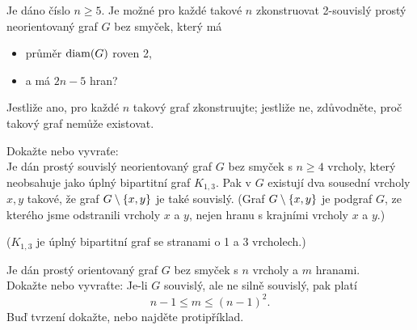\documentclass[11pt,a4paper]{article}
\begin{document}
\title{}
\author{Jakub Adamec\\XP01TGR}

\maketitle

\begin{exercise}
    Je dáno číslo $n \geq 5$. Je možné pro každé takové $n$ zkonstruovat 2-souvislý prostý neorientovaný graf $G$ bez 
    smyček, který má
    \vspace{-1em}
    \begin{itemize}[noitemsep]
        \item průměr $\operatorname*{diam}(G)$ roven 2,
        \item a má $2n-5$ hran?
    \end{itemize}
    \vspace{-1em}
    Jestliže ano, pro každé $n$ takový graf zkonstruujte; jestliže ne, zdůvodněte, proč takový graf nemůže existovat.
\end{exercise}
\begin{solution}

\end{solution}

\begin{exercise}
    Dokažte nebo vyvraťe:\\
    Je dán prostý souvislý neorientovaný graf $G$ bez smyček s $n \geq 4$ vrcholy, který neobsahuje jako  úplný bipartitní graf $K_{1,3}$. Pak v $G$ existují dva sousední vrcholy $x,y$ takové, že graf $G \setminus
    \left\lbrace x,y \right\rbrace$ je také souvislý. (Graf $G \setminus \left\lbrace x,y \right\rbrace$ je podgraf $G$, ze kterého jsme odstranili vrcholy $x$ a 
    $y$, nejen hranu s krajními vrcholy $x$ a $y$.)

    ($K_{1,3}$ je úplný bipartitní graf se stranami o 1 a 3 vrcholech.)
\end{exercise}
\begin{solution}
    
\end{solution}

\begin{exercise}
    Je dán prostý orientovaný graf $G$ bez smyček s $n$ vrcholy a $m$ hranami.\\
    Dokažte nebo vyvraťte: Je-li $G$ souvislý, ale ne silně souvislý, pak platí
    \begin{equation*}
        n - 1 \leq m \leq (n-1)^2.
    \end{equation*}
    Buď tvrzení dokažte, nebo najděte protipříklad.
\end{exercise}
\begin{solution}
    
\end{solution}
\end{document}
